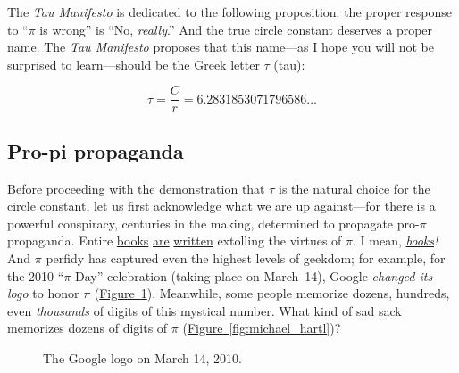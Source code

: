 \documentclass{article}
\begin{document}
The \emph{Tau Manifesto} is dedicated to the following proposition: the proper response to ``$\pi$ is wrong'' is ``No, \emph{really}.'' And the true circle constant deserves a proper name. The \emph{Tau Manifesto} proposes that this name---as I hope you will not be surprised to learn---should be the Greek letter $\tau$ (tau):

\[
  \tau = \frac{C}{r} = 6.2831853071796586\ldots
\]


 \subsection{Pro-pi propaganda} %

Before proceeding with the demonstration that $\tau$ is the natural choice for the circle constant, let us first acknowledge what we are up against---for there is a powerful conspiracy, centuries in the making, determined to propagate pro-$\pi$ propaganda. Entire \href{http://www.amazon.com/exec/obidos/ISBN=0802713327/parallaxproductiA/}{books} \href{http://www.amazon.com/Pi-Sky-Counting-Thinking-Being/dp/0198539568}{are} \href{http://www.amazon.com/exec/obidos/ISBN=0312381859/parallaxproductiA/}{written} extolling the virtues of $\pi$. I mean, \href{http://www.amazon.com/exec/obidos/ISBN=0387989463/parallaxproductiA/}{\emph{books}}\emph{!} And $\pi$ perfidy has captured even the highest levels of geekdom; for example, for the 2010 ``$\pi$ Day'' celebration (taking place on March~14), Google \emph{changed its logo} to honor $\pi$  (\hyperref[fig:google-pi-day]{Figure~}\ref{fig:google-pi-day}).  Meanwhile, some people memorize dozens, hundreds, even \emph{thousands} of digits of this mystical number. What kind of sad sack memorizes dozens of digits of $\pi$ (\hyperref[fig:michael_hartl]{Figure~}\ref{fig:michael_hartl})?

\begin{figure}
\begin{center}
\end{center}
\caption{The Google logo on March 14, 2010.\label{fig:google-pi-day}}
\end{figure}
\end{document}
